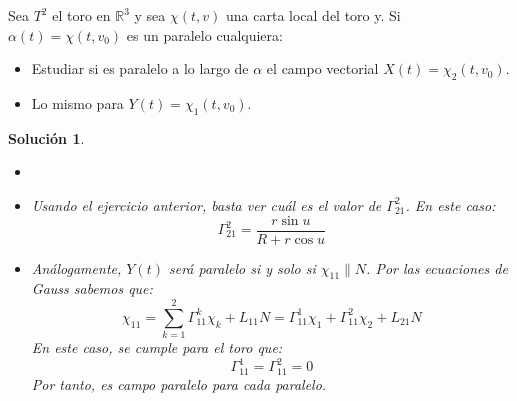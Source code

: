 \documentclass{article}
\theoremstyle{plain}
\newtheorem*{sol*}{Solución}
\newcommand{\R}{\mathbb{R}}
\newcommand{\X}{\chi}
\newenvironment{ejercicio}[2][Estado]{\begin{trivlist}
\item[\hskip \labelsep {\bfseries Ejercicio}\hskip \labelsep {\bfseries #2.}]}{\end{trivlist}}
\begin{document}
\newpage
\begin{ejercicio}{11}
Sea $T^2$ el toro en $\R^3$ y sea $\X(t,v)$ una carta local del toro y. Si $\alpha(t)=\X(t,v_0)$ es un paralelo cualquiera:
\begin{itemize}
\item Estudiar si es paralelo a lo largo de $\alpha$ el campo vectorial $X(t)=\X_2(t,v_0)$.
\item Lo mismo para $Y(t)=\X_1(t,v_0)$.
\end{itemize}
\end{ejercicio}
\begin{sol*}
\begin{itemize}
\item[]
\item Usando el ejercicio anterior, basta ver cuál es el valor de $\Gamma_{21}^2$. En este caso:
\[
\Gamma_{21}^2 = \frac{r\sin u}{R+r\cos u}
\]
\item Análogamente, $Y(t)$ será paralelo si y solo si $\X_{11} \parallel N$. Por las ecuaciones de Gauss sabemos que:
\[
\X_{11} = \sum_{k=1}^2 \Gamma_{11}^k \X_k+ L_{11}N = \Gamma_{11}^1\X_1 + \Gamma_{11}^2\X_2 + L_{21}N
\]
En este caso, se cumple para el toro que:
\[\Gamma_{11}^1=\Gamma_{11}^2=0
\]
Por tanto, es campo paralelo para cada paralelo.
\end{itemize}
\end{sol*}
\end{document}
